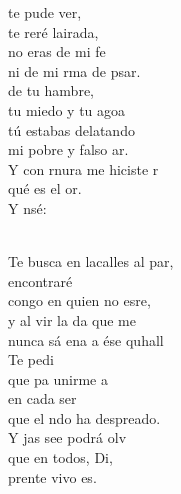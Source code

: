 \documentclass[12pt]{article}
\begin{document}
\begin{multicols*}{2}
\begin{cancion}%
	 te pude ver,\\
	te reré lairada,\\
no eras de mi fe \\
	ni de mi rma de psar.\\
\jump
	 de tu hambre, \\
	tu miedo y tu agoa \\
tú estabas delatando\\
	mi pobre y falso ar.\\
	Y con rnura me hiciste r \\
	qué es el or.\\
	Y nsé:\\\jump\\
	\begin{chorus}%
	Te busca en lacalles al par,\\
	 encontraré \\
	congo en quien no esre,\\
	y al vir la da que me \\
	nunca sá ena a ése quhall\\
\jump
	Te pedi \\
	que pa unirme a      \\
en cada ser\\
	que el ndo ha despreado.\\
	Y jas see podrá olv \\
	que en todos, Di,\\
	prente vivo es. \\
	\end{chorus}%
	\jump\\
\end{cancion}%


\end{multicols*}
\end{document}
